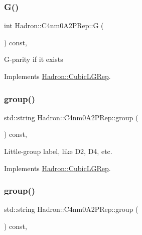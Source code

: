 \subsubsection{\texorpdfstring{G()}{G()}\hspace{0.1cm}{\footnotesize\ttfamily [2/2]}}
{\footnotesize\ttfamily int Hadron\+::\+C4nm0\+A2\+P\+Rep\+::G (\begin{DoxyParamCaption}{ }\end{DoxyParamCaption}) const\hspace{0.3cm}{\ttfamily [inline]}, {\ttfamily [virtual]}}

G-\/parity if it exists 

Implements \mbox{\hyperlink{structHadron_1_1CubicLGRep_ace26f7b2d55e3a668a14cb9026da5231}{Hadron\+::\+Cubic\+L\+G\+Rep}}.

\mbox{\label{structHadron_1_1C4nm0A2PRep_a37929ac674c03d89c04c8c8d34f88e02}} 
\subsubsection{\texorpdfstring{group()}{group()}\hspace{0.1cm}{\footnotesize\ttfamily [1/2]}}
{\footnotesize\ttfamily std\+::string Hadron\+::\+C4nm0\+A2\+P\+Rep\+::group (\begin{DoxyParamCaption}{ }\end{DoxyParamCaption}) const\hspace{0.3cm}{\ttfamily [inline]}, {\ttfamily [virtual]}}

Little-\/group label, like D2, D4, etc. 

Implements \mbox{\hyperlink{structHadron_1_1CubicLGRep_a9bdb14b519a611d21379ed96a3a9eb41}{Hadron\+::\+Cubic\+L\+G\+Rep}}.

\mbox{\label{structHadron_1_1C4nm0A2PRep_a37929ac674c03d89c04c8c8d34f88e02}} 
\subsubsection{\texorpdfstring{group()}{group()}\hspace{0.1cm}{\footnotesize\ttfamily [2/2]}}
{\footnotesize\ttfamily std\+::string Hadron\+::\+C4nm0\+A2\+P\+Rep\+::group (\begin{DoxyParamCaption}{ }\end{DoxyParamCaption}) const\hspace{0.3cm}{\ttfamily [inline]}, {\ttfamily [virtual]}}

